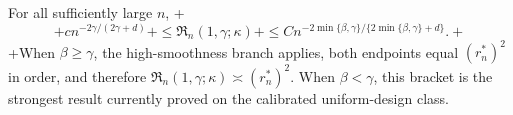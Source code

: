 For all sufficiently large \(n\),
+\[
+c n^{-2\gamma/(2\gamma+d)}
+\le \mathfrak R_n(1,\gamma;\kappa)
+\le C n^{-2\min\{\beta,\gamma\}/\{2\min\{\beta,\gamma\}+d\}}.
+\]
+When \(\beta\ge\gamma\), the high-smoothness branch applies, both endpoints equal \((r_n^*)^2\) in order, and therefore \(\mathfrak R_n(1,\gamma;\kappa)\asymp(r_n^*)^2\). When \(\beta<\gamma\), this bracket is the strongest result currently proved on the calibrated uniform-design class.